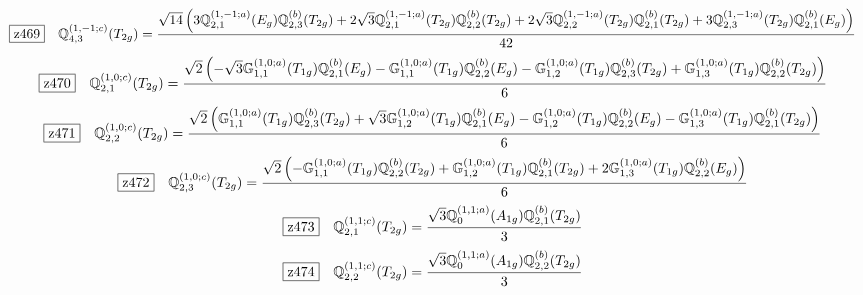 \documentclass[fleqn,10pt,landscape]{jsarticle}
\begin{document}
\begin{dmath*}
\hspace*{3mm}\fbox{z469}\quad \mathbb{Q}_{4,3}^{(1,-1;c)}(T_{2g})=\frac{\sqrt{14} \left(3 \mathbb{Q}_{2,1}^{(1,-1;a)}(E_{g}) \mathbb{Q}_{2,3}^{(b)}(T_{2g}) + 2 \sqrt{3} \mathbb{Q}_{2,1}^{(1,-1;a)}(T_{2g}) \mathbb{Q}_{2,2}^{(b)}(T_{2g}) + 2 \sqrt{3} \mathbb{Q}_{2,2}^{(1,-1;a)}(T_{2g}) \mathbb{Q}_{2,1}^{(b)}(T_{2g}) + 3 \mathbb{Q}_{2,3}^{(1,-1;a)}(T_{2g}) \mathbb{Q}_{2,1}^{(b)}(E_{g})\right)}{42}
\end{dmath*}
\begin{dmath*}
\hspace*{3mm}\fbox{z470}\quad \mathbb{Q}_{2,1}^{(1,0;c)}(T_{2g})=\frac{\sqrt{2} \left(- \sqrt{3} \mathbb{G}_{1,1}^{(1,0;a)}(T_{1g}) \mathbb{Q}_{2,1}^{(b)}(E_{g}) - \mathbb{G}_{1,1}^{(1,0;a)}(T_{1g}) \mathbb{Q}_{2,2}^{(b)}(E_{g}) - \mathbb{G}_{1,2}^{(1,0;a)}(T_{1g}) \mathbb{Q}_{2,3}^{(b)}(T_{2g}) + \mathbb{G}_{1,3}^{(1,0;a)}(T_{1g}) \mathbb{Q}_{2,2}^{(b)}(T_{2g})\right)}{6}
\end{dmath*}
\begin{dmath*}
\hspace*{3mm}\fbox{z471}\quad \mathbb{Q}_{2,2}^{(1,0;c)}(T_{2g})=\frac{\sqrt{2} \left(\mathbb{G}_{1,1}^{(1,0;a)}(T_{1g}) \mathbb{Q}_{2,3}^{(b)}(T_{2g}) + \sqrt{3} \mathbb{G}_{1,2}^{(1,0;a)}(T_{1g}) \mathbb{Q}_{2,1}^{(b)}(E_{g}) - \mathbb{G}_{1,2}^{(1,0;a)}(T_{1g}) \mathbb{Q}_{2,2}^{(b)}(E_{g}) - \mathbb{G}_{1,3}^{(1,0;a)}(T_{1g}) \mathbb{Q}_{2,1}^{(b)}(T_{2g})\right)}{6}
\end{dmath*}
\begin{dmath*}
\hspace*{3mm}\fbox{z472}\quad \mathbb{Q}_{2,3}^{(1,0;c)}(T_{2g})=\frac{\sqrt{2} \left(- \mathbb{G}_{1,1}^{(1,0;a)}(T_{1g}) \mathbb{Q}_{2,2}^{(b)}(T_{2g}) + \mathbb{G}_{1,2}^{(1,0;a)}(T_{1g}) \mathbb{Q}_{2,1}^{(b)}(T_{2g}) + 2 \mathbb{G}_{1,3}^{(1,0;a)}(T_{1g}) \mathbb{Q}_{2,2}^{(b)}(E_{g})\right)}{6}
\end{dmath*}
\begin{dmath*}
\hspace*{3mm}\fbox{z473}\quad \mathbb{Q}_{2,1}^{(1,1;c)}(T_{2g})=\frac{\sqrt{3} \mathbb{Q}_{0}^{(1,1;a)}(A_{1g}) \mathbb{Q}_{2,1}^{(b)}(T_{2g})}{3}
\end{dmath*}
\begin{dmath*}
\hspace*{3mm}\fbox{z474}\quad \mathbb{Q}_{2,2}^{(1,1;c)}(T_{2g})=\frac{\sqrt{3} \mathbb{Q}_{0}^{(1,1;a)}(A_{1g}) \mathbb{Q}_{2,2}^{(b)}(T_{2g})}{3}
\end{dmath*}
\end{document}
